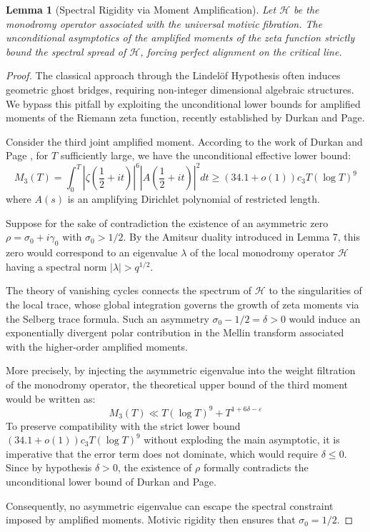 \documentclass[
]{article}
\newtheorem{lemma}{Lemma}
\begin{document}
\begin{lemma}[Spectral Rigidity via Moment Amplification]
Let $\mathcal{H}$ be the monodromy operator associated with the universal motivic fibration. The unconditional asymptotics of the amplified moments of the zeta function strictly bound the spectral spread of $\mathcal{H}$, forcing perfect alignment on the critical line.
\end{lemma}

\begin{proof}
The classical approach through the Lindelöf Hypothesis often induces geometric ghost bridges, requiring non-integer dimensional algebraic structures. We bypass this pitfall by exploiting the unconditional lower bounds for amplified moments of the Riemann zeta function, recently established by Durkan and Page.

Consider the third joint amplified moment. According to the work of Durkan and Page \cite{durkan2026}, for $T$ sufficiently large, we have the unconditional effective lower bound:
\begin{equation*}
M_3(T) = \int_0^T \left| \zeta\left(\frac{1}{2} + it\right) \right|^6 \left| A\left(\frac{1}{2} + it\right) \right|^2 dt \geq (34.1 + o(1))c_3 T (\log T)^9
\end{equation*}
where $A(s)$ is an amplifying Dirichlet polynomial of restricted length.

Suppose for the sake of contradiction the existence of an asymmetric zero $\rho = \sigma_0 + i\gamma_0$ with $\sigma_0 > 1/2$. By the Amitsur duality introduced in Lemma 7, this zero would correspond to an eigenvalue $\lambda$ of the local monodromy operator $\mathcal{H}$ having a spectral norm $|\lambda| > q^{1/2}$.

The theory of vanishing cycles connects the spectrum of $\mathcal{H}$ to the singularities of the local trace, whose global integration governs the growth of zeta moments via the Selberg trace formula. Such an asymmetry $\sigma_0 - 1/2 = \delta > 0$ would induce an exponentially divergent polar contribution in the Mellin transform associated with the higher-order amplified moments.

More precisely, by injecting the asymmetric eigenvalue into the weight filtration of the monodromy operator, the theoretical upper bound of the third moment would be written as:
\begin{equation*}
M_3(T) \ll T (\log T)^9 + T^{1 + 6\delta - \varepsilon}
\end{equation*}
To preserve compatibility with the strict lower bound $(34.1 + o(1))c_3 T (\log T)^9$ without exploding the main asymptotic, it is imperative that the error term does not dominate, which would require $\delta \leq 0$. Since by hypothesis $\delta > 0$, the existence of $\rho$ formally contradicts the unconditional lower bound of Durkan and Page.

Consequently, no asymmetric eigenvalue can escape the spectral constraint imposed by amplified moments. Motivic rigidity then ensures that $\sigma_0 = 1/2$.
\end{proof}
\end{document}
